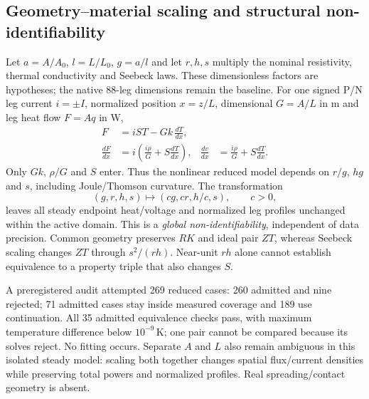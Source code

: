 \documentclass[11pt,a4paper]{article}
\begin{document}
\clearpage
\subsection{Geometry--material scaling and structural non-identifiability}
Let $a=A/A_0$, $l=L/L_0$, $g=a/l$ and let $r,h,s$ multiply the nominal
resistivity, thermal conductivity and Seebeck laws. These dimensionless factors
are hypotheses; the native 88-leg dimensions remain the baseline. For one
signed P/N leg current $i=\pm I$, normalized position $x=z/L$, dimensional
$G=A/L$ in m and leg heat flow $F=Aq$ in W,
\begin{align}
F&=iST-Gk\,\frac{dT}{dx},\\
\frac{dF}{dx}&=i\left(\frac{i\rho}{G}+S\frac{dT}{dx}\right), &
\frac{dv}{dx}&=\frac{i\rho}{G}+S\frac{dT}{dx}.
\end{align}
Only $Gk$, $\rho/G$ and $S$ enter. Thus the nonlinear reduced model depends on
$r/g$, $hg$ and $s$, including Joule/Thomson curvature. The transformation
\begin{equation}
(g,r,h,s)\longmapsto(cg,cr,h/c,s),\qquad c>0,
\end{equation}
leaves all steady endpoint heat/voltage and normalized leg profiles unchanged
within the active domain. This is a \emph{global non-identifiability}, independent
of data precision. Common geometry preserves $RK$ and ideal pair $ZT$, whereas
Seebeck scaling changes $ZT$ through $s^2/(rh)$. Near-unit $rh$ alone cannot
establish equivalence to a property triple that also changes $S$.

A preregistered audit attempted 269 reduced cases: 260 admitted and nine rejected;
71 admitted cases stay inside measured coverage and 189 use continuation. All
35 admitted equivalence checks pass, with maximum temperature difference below
$10^{-9}$\,K; one pair cannot be compared because its solves reject. No fitting
occurs. Separate $A$ and $L$ also remain ambiguous in this isolated steady model:
scaling both together changes spatial flux/current densities while preserving
total powers and normalized profiles. Real spreading/contact geometry is absent.
\end{document}
